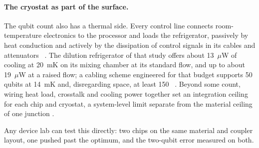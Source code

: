 \paragraph{The cryostat as part of the surface.} The qubit count also has a thermal side. Every control line connects room-temperature
electronics to the processor and loads the refrigerator, passively by heat conduction and actively by the dissipation of control signals
in its cables and attenuators~\cite{Krinner2019} \observed. The dilution refrigerator of that study offers about 13~$\mu$W of
cooling at 20~mK on its mixing chamber at its standard flow, and up to about 19~$\mu$W at a raised flow; a cabling scheme engineered for that budget supports 50 qubits at 14~mK and,
disregarding space, at least 150~\cite{Krinner2019} \observed. Beyond some count, wiring heat load, crosstalk and cooling power together
set an integration ceiling for each chip and cryostat, a system-level limit separate from the material ceiling of one junction \interp.

Any device lab can test this directly: two chips on the same material and coupler layout, one pushed past the optimum, and the two-qubit error
measured on both.
